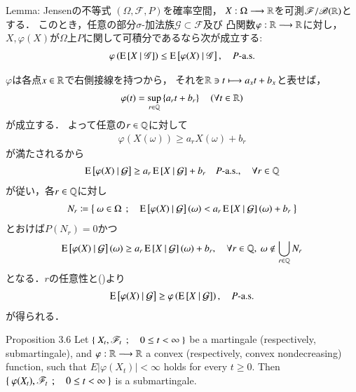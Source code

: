 	\begin{itembox}[l]{Lemma: Jensenの不等式}
		$(\Omega,\mathscr{F},P)$を確率空間，
		$X:\Omega \longrightarrow \mathbb{R}$を可測$\mathscr{F}/\mathscr{B}(\mathbb{R})$とする．
		このとき，任意の部分$\sigma$-加法族$\mathscr{G} \subset \mathscr{F}$及び
		凸関数$\varphi:\mathbb{R} \longrightarrow \mathbb{R}$に対し，
		$X,\varphi(X)$が$\Omega$上$P$に関して可積分であるなら次が成立する:
		\begin{align}
			\varphi\left(\operatorname{E} \left[ X \ \middle|\ \mathscr{G} \right] \right)
			\leq \operatorname{E} \left[ \varphi(X) \ \middle|\ \mathscr{G} \right],
			\quad \mbox{$P$-a.s.}
		\end{align}
	\end{itembox}
		\begin{prf}
			$\varphi$は各点$x \in \mathbb{R}$で右側接線を持つから，
			それを$\mathbb{R} \ni t \longmapsto a_x t + b_x$と表せば，
			\begin{align}
				\varphi(t) = \operatorname*{sup}_{r \in \mathbb{Q}} \left\{ a_r t + b_r \right\} \quad (\forall t \in \mathbb{R})
				\label{eq:prp_properties_of_expanded_conditional_expectation_1}
			\end{align}
			が成立する．
			よって任意の$r \in \mathbb{Q}$に対して
			\begin{align}
				\varphi(X(\omega)) \geq a_r X(\omega) + b_r
			\end{align}
			が満たされるから
			\begin{align}
				\operatorname{E} \left[ \varphi(X) \ \middle|\ \mathcal{G} \right]
				\geq a_r \operatorname{E} \left[ X \ \middle|\ \mathcal{G} \right] + b_r 
				\quad \mbox{$P$-a.s.},
				\quad \forall r \in \mathbb{Q} 
			\end{align}
			が従い，各$r \in \mathbb{Q}$に対し
			\begin{align}
				N_r \coloneqq \left\{\ \omega \in \Omega\ \, ; \quad \operatorname{E} \left[ \varphi(X) \ \middle|\ \mathcal{G} \right](\omega)
				< a_r \operatorname{E} \left[ X \ \middle|\ \mathcal{G} \right](\omega) + b_r\ \right\}
			\end{align}
			とおけば$P(N_r) = 0$かつ
			\begin{align}
				\operatorname{E} \left[ \varphi(X) \ \middle|\ \mathcal{G} \right](\omega)
				\geq a_r \operatorname{E} \left[ X \ \middle|\ \mathcal{G} \right](\omega) + b_r, 
				\quad \forall r \in \mathbb{Q},\ \omega \notin \bigcup_{r \in \mathbb{Q}} N_r
			\end{align}
			となる．$r$の任意性と()より
			\begin{align}
				\operatorname{E} \left[ \varphi(X) \ \middle|\ \mathcal{G} \right] \geq \varphi\left( \operatorname{E} \left[ X \ \middle|\ \mathcal{G} \right] \right),
				\quad \mbox{$P$-a.s.}
			\end{align}
			が得られる．
			\QED
		\end{prf}
		
	\begin{itembox}[l]{Proposition 3.6}
		Let $\left\{\ X_t,\mathscr{F}_t\ \, ; \quad 0 \leq t < \infty\ \right\}$ be a martingale (respectively, 
		submartingale), and $\varphi:\mathbb{R} \longrightarrow \mathbb{R}$ a convex (respectively, convex 
		nondecreasing) function, such that $E\left|\varphi(X_t)\right| < \infty$ holds 
		for every $t \geq 0$. Then $\left\{\ \varphi(X_t),\mathscr{F}_t\ \, ; \quad 0 \leq t < \infty\ \right\}$ 
		is a submartingale.
	\end{itembox}
	
